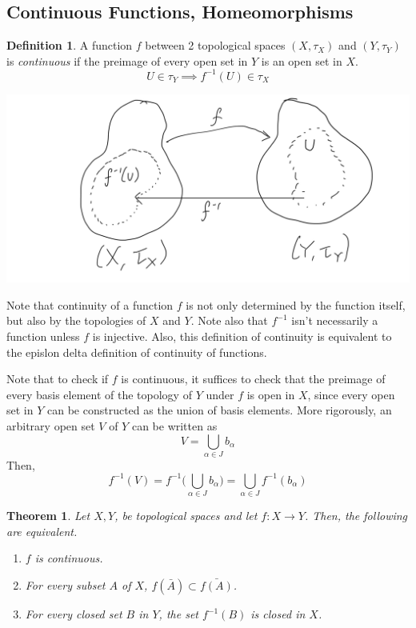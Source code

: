 \documentclass{article}
\newtheorem{theorem}{Theorem}[section]
\theoremstyle{remark}
\theoremstyle{definition}
\newtheorem{definition}{Definition}[section]
\begin{document}
\subsection{Continuous Functions, Homeomorphisms}
\begin{definition}
A function $f$ between 2 topological spaces $(X, \tau_{X})$ and $(Y, \tau_{Y})$ is \textit{continuous} if the preimage of every open set in $Y$ is an open set in $X$.
\[ U \in \tau_{Y} \implies f^{-1}(U) \in \tau_{X}\]
\begin{center}    \includegraphics[scale=0.20]{img/Topological_Continuity_of_Functions.PNG}
\end{center}
Note that continuity of a function $f$ is not only determined by the function itself, but also by the topologies of $X$ and $Y$. Note also that $f^{-1}$ isn't necessarily a function unless $f$ is injective. Also, this definition of continuity is equivalent to the epislon delta definition of continuity of functions. 
\end{definition}

Note that to check if $f$ is continuous, it suffices to check that the preimage of every basis element of the topology of $Y$ under $f$ is open in $X$, since every open set in $Y$ can be constructed as the union of basis elements. More rigorously, an arbitrary open set $V$ of $Y$ can be written as 
\[V = \bigcup_{\alpha \in J} b_\alpha\]
Then, 
\[f^{-1} (V) = f^{-1} \Big( \bigcup_{\alpha \in J} b_\alpha \Big) = \bigcup_{\alpha \in J} f^{-1} (b_\alpha)\]

\begin{theorem}
Let $X, Y$, be topological spaces and let $f: X \longrightarrow Y$. Then, the following are equivalent. 
\begin{enumerate}
    \item $f$ is continuous. 
    \item For every subset $A$ of $X$, $f(\bar{A}) \subset \bar{f(A)}$. 
    \item For every closed set $B$ in $Y$, the set $f^{-1} (B)$ is closed in $X$. 
\end{enumerate}
\end{theorem}
\end{document}
